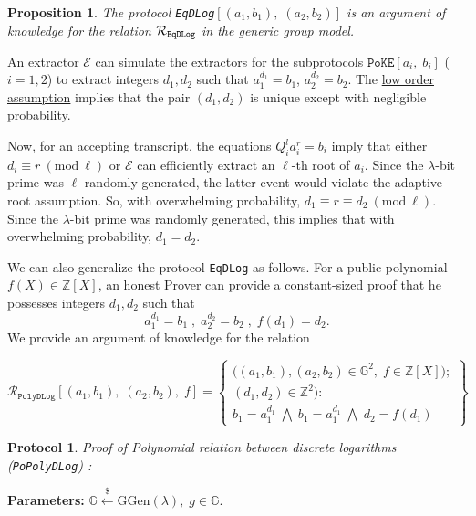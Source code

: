 \documentclass[11pt, lettersize, notitlepage, leqno, footskip=0.6cm]{article}
\newcommand{\bz}{\mathbb Z}
\newcommand{\ttt}{\texttt}
\newcommand{\mc}{\mathcal}
\newcommand{\mb}{\mathbb}
\newcommand{\mr}{\mathrm}
\newcommand{\lam}{\lambda}
\newcommand{\lamb}{\lambda}
\newcommand{\vs}{\vspace{-0.15cm}}
\newcommand{\op}{overwhelming probability}
\newcommand{\np}{negligible probability}
\newcommand{\Mod}[1]{\ (\mathrm{mod}\ #1)}
\newcommand{\E}{\mc{E}}
\newtheorem{Prop}[Thm]{Proposition}
\newtheorem{Prot}[Thm]{Protocol}
\numberwithin{equation}{section}
\begin{document}
\begin{Prop} The protocol \verb|EqDLog|$[(a_1, b_1),\; (a_2, b_2)]$ is an argument of knowledge for the relation $\mc{R}_{{\tt{{EqDLog}}}}$ in the generic group model.\end{Prop}

\begin{prf} An extractor $\E$ can simulate the extractors for the subprotocols $\ttt{PoKE}[a_i,\;b_i]$ ($i=1,2$) to extract integers $d_1,d_2$ such that $a_1^{d_1} = b_1$, $a_2^{d_2} = b_2$. The \hyperlink{low order}{low order assumption} implies that the pair $(d_1,d_2)$ is unique except with \np. 

Now, for an accepting transcript, the equations $Q_i^{l}a_i^{r} = b_i$ imply that either $d_i\equiv r\Mod{\ell}$ or $\E$ can efficiently extract an $\ell$-th root of $a_i$. Since the $\lam$-bit prime was $\ell$ randomly generated, the latter event would violate the adaptive root assumption. So, with \op, $d_1\equiv r\equiv d_2\Mod{\ell}$. Since the $\lam$-bit prime was randomly generated, this implies that with \op, $d_1 = d_2$.\end{prf}

\vspace{0.2cm}



\noindent We can also generalize the protocol \verb|EqDLog| as follows. For a public polynomial {$f(X)\in \bz[X]$}, an honest Prover can provide a constant-sized proof that he possesses integers $d_1,d_2$ such that \vs $$a_1^{d_1} = b_1\;,\;a_2^{d_2} = b_2\;,\;f(d_1) = d_2.$$ We provide an argument of knowledge for the relation 

\[
  \mc{R}_{{\ttt{PolyDLog}}}[(a_1, b_1),\;(a_2,b_2),\;f] = \left\{\begin{array}{l}
    \big((a_1, b_1), (a_2,b_2)\in\mb{G}^2,\;f\in\bz[X]\big);\\
    (d_1, d_2)\in\mb{Z}^2): \\
    b_1 = a_1^{d_1}\; \bigwedge\; b_1 = a_1^{d_1}\; \bigwedge \;d_2 = f(d_1)
  \end{array}\right\}
\] 

\vspace{0.1cm}


\begin{Prot} \normalfont \textit{Proof of Polynomial relation between discrete logarithms} (\verb|PoPolyDLog|) :\end{Prot} \vspace{-0.3cm}

\noindent \textbf{Parameters:} $\mb{G}\xleftarrow{\$} \mr{GGen}(\lamb), \; g\in \mb{G}$.
\end{document}
